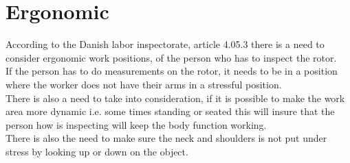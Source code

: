 \section{Ergonomic}
According to the Danish labor inspectorate, article 4.05.3 there is a need to consider ergonomic work positions, of the person who has to inspect the rotor.\\
If the person has to do measurements on the rotor, it needs to be in a position where the worker does not have their arms in a stressful position.\\
There is also a need to take into consideration, if it is possible to make the work area more dynamic i.e. some times standing or seated this will insure that the person how is inspecting will keep the body function working.\\
There is also the need to make sure the neck and shoulders is not put under stress by looking up or down on the object\cite{ATpostions}.